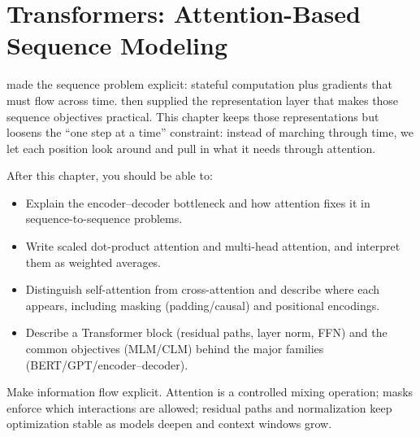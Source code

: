 \section{Transformers: Attention-Based Sequence Modeling}\label{chap:transformers}

 made the sequence problem explicit: stateful computation plus gradients that must flow across time.  then supplied the representation layer that makes those sequence objectives practical. This chapter keeps those representations but loosens the ``one step at a time'' constraint: instead of marching through time, we let each position look around and pull in what it needs through attention.

\begin{tcolorbox}[summarybox, title={Learning Outcomes}]
After this chapter, you should be able to:
\begin{itemize}
  \item Explain the encoder--decoder bottleneck and how attention fixes it in sequence-to-sequence problems.
  \item Write scaled dot-product attention and multi-head attention, and interpret them as weighted averages.
  \item Distinguish self-attention from cross-attention and describe where each appears, including masking (padding/causal) and positional encodings.
  \item Describe a Transformer block (residual paths, layer norm, FFN) and the common objectives (MLM/CLM) behind the major families (BERT/GPT/encoder--decoder).
\end{itemize}
\end{tcolorbox}

\begin{tcolorbox}[summarybox, title={Design motif}]
Make information flow explicit. Attention is a controlled mixing operation; masks enforce which interactions are allowed; residual paths and normalization keep optimization stable as models deepen and context windows grow.
\end{tcolorbox}

